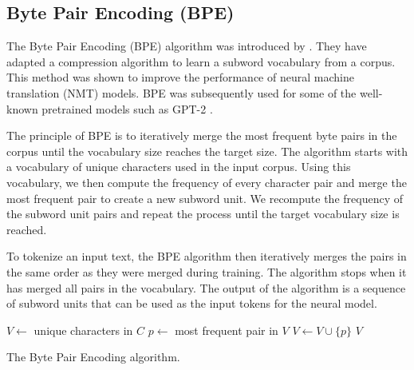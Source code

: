 

\subsection{Byte Pair Encoding (BPE)}

The Byte Pair Encoding (BPE) algorithm was introduced by \citet{sennrich_neural_2016}. They have adapted a compression algorithm \cite{gage_new_1994} to learn a subword vocabulary from a corpus. This method was shown to improve the performance of neural machine translation (NMT) models. BPE was subsequently used for some of the well-known pretrained models such as GPT-2 \citep{radford_improving_2018}.

The principle of BPE is to iteratively merge the most frequent byte pairs in the corpus until the vocabulary size reaches the target size. The algorithm starts with a vocabulary of unique characters used in the input corpus. Using this vocabulary, we then compute the frequency of every character pair and merge the most frequent pair to create a new subword unit. We recompute the frequency of the subword unit pairs and repeat the process until the target vocabulary size is reached.

To tokenize an input text, the BPE algorithm then iteratively merges the pairs in the same order as they were merged during training. The algorithm stops when it has merged all pairs in the vocabulary. The output of the algorithm is a sequence of subword units that can be used as the input tokens for the neural model.

\begin{algorithm}
    \begin{algorithmic}
        \State $V \gets$ unique characters in $C$
        \State $p \gets$ most frequent pair in $V$
        \State $V \gets V \cup \{p\}$
        \EndWhile
        \State \Return $V$
        \EndFunction
    \end{algorithmic}
    \caption{The Byte Pair Encoding algorithm.}
    \label{alg:bpe}
\end{algorithm}

